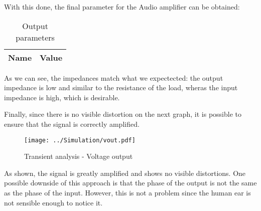 With this done, the final parameter for the Audio amplifier can be obtained:

\begin{table}[H]
  \centering
  \begin{tabular}{|l|r|}
    \hline    
    {\bf Name} & {\bf Value} \\ \hline
    
  \end{tabular}
  \caption{Output parameters}
  \label{tab: OutputParamNGS}
\end{table}

As we can see, the impedances match what we expectected: the output impedance is low and similar to the resistance of the load, wheras the input impedance is high, which is desirable.


Finally, since there is no visible distortion on the next graph, it is possible to ensure that the signal is correctly amplified.


\begin{figure}[h!]
    \centering
  \texttt{[image: ../Simulation/vout.pdf]}
  \caption{Transient analysis - Voltage output}
  \label{tab:TransNGS}
\end{figure}


As shown, the signal is greatly amplified and shows no visible distortions. One possible downside of this approach is that the phase of the output is not the same as the phase of the input. However, this is not a problem since the human ear is not sensible enough to notice it.
